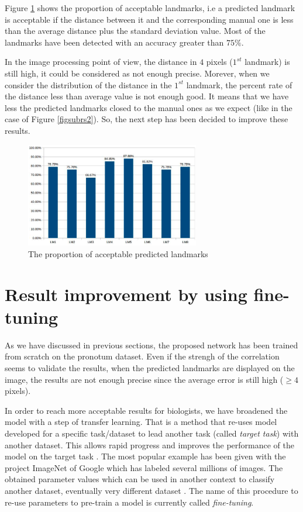 \documentclass{article} %
\begin{document}
\begin{multicols}{2}
Figure \ref{figchart} shows the proportion of acceptable landmarks, i.e a predicted landmark is acceptable if the distance between it and the corresponding manual one is less than the average distance plus the standard deviation  value. Most of the landmarks have been detected with an accuracy greater than $75\%$. 

In the image processing point of view, the distance in $4$ pixels ($1^{st}$ landmark) is still high, it could be considered as not enough precise. Morever, when we consider the distribution of the distance in the $1^{st}$ landmark, the percent rate of the distance less than average value is not enough good. It means that we have less the predicted landmarks closed to the manual ones as we expect (like in the case of Figure \ref{figsubrs2}). So, the next step has been decided to improve these results. 

\begin{figure}[H]
	\centerline{\includegraphics[height=1.8in]{images/chart.eps}}
	\caption{\footnotesize{The proportion of acceptable predicted landmarks}}
	\label{figchart}
\end{figure}

\section{Result improvement by using fine-tuning}
\label{secimproving}
As we have discussed in previous sections, the proposed network has been trained from scratch on the pronotum dataset. Even if the strengh of the correlation seems to validate the results, when the predicted landmarks are displayed on the image, the results are not enough precise since the average error is still high ($\geq 4$ pixels).

In order to reach more acceptable results for biologists, we have
broadened the model with a step of transfer learning. That is a
method that re-uses model developed for a specific task/dataset
to lead another task (called \textit{target task}) with another dataset. This allows rapid progress and improves the performance of the model on the target task \cite{torrey2009transfer}. The most popular
example has been given with the project ImageNet of Google \cite{imagenet_cvpr09} which has labeled several millions of images. The obtained parameter values which can
be used in another context to classify another dataset, eventually
very different dataset \cite{margeta2017fine}. The name of this procedure to re-use parameters
to pre-train a model is currently called \textit{fine-tuning}.


\end{multicols}
\end{document}
